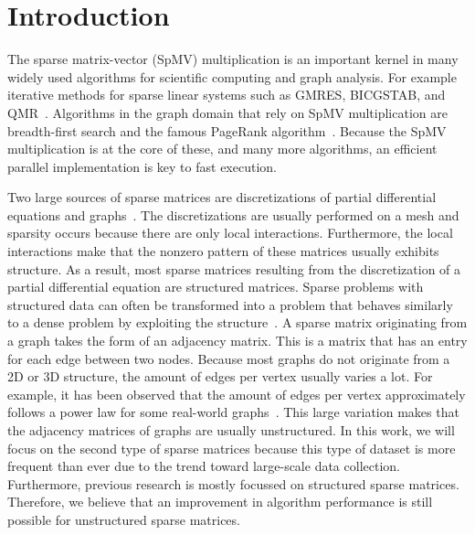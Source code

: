 \documentclass{siamart220329}
\begin{document}
\section{Introduction}
The sparse matrix-vector (SpMV) multiplication is an important kernel in many widely used algorithms for scientific computing and graph analysis. For example iterative methods for sparse linear systems such as GMRES, BICGSTAB, and QMR~\cite{saad}. Algorithms in the graph domain that rely on SpMV multiplication are breadth-first search and the famous PageRank algorithm~\cite{GAP-eval}. Because the SpMV multiplication is at the core of these, and many more algorithms, an efficient parallel implementation is key to fast execution. 

Two large sources of sparse matrices are discretizations of partial differential equations and graphs~\cite{SparseTamuEdu}. The discretizations are usually performed on a mesh and sparsity occurs because there are only local interactions. Furthermore, the local interactions make that the nonzero pattern of these matrices usually exhibits structure. As a result, most sparse matrices resulting from the discretization of a partial differential equation are structured matrices. Sparse problems with structured data can often be transformed into a problem that behaves similarly to a dense problem by exploiting the structure~\cite{SBD, Matrix-Partitioning}. A sparse matrix originating from a graph takes the form of an adjacency matrix. This is a matrix that has an entry for each edge between two nodes. Because most graphs do not originate from a 2D or 3D structure, the amount of edges per vertex usually varies a lot. For example, it has been observed that the amount of edges per vertex approximately follows a power law for some real-world graphs~\cite{PowerLawBiology, PowerLawInternet, PowerLawNature}. This large variation makes that the adjacency matrices of graphs are usually unstructured. In this work, we will focus on the second type of sparse matrices because this type of dataset is more frequent than ever due to the trend toward large-scale data collection. Furthermore, previous research is mostly focussed on structured sparse matrices. Therefore, we believe that an improvement in algorithm performance is still possible for unstructured sparse matrices.
\end{document}

